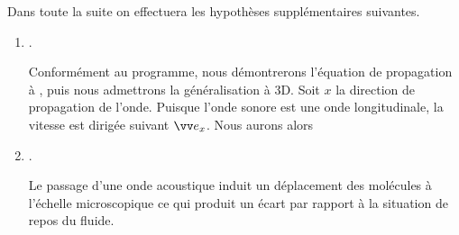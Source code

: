 \documentclass[12pt,fancy]{cours}
\begin{document}


 Dans toute la suite on effectuera les hypothèses supplémentaires suivantes. 
\begin{enumerate}[label=\boxed{\rm H\arabic*}]
\item {}.

Conformément au programme, nous démontrerons l'équation de propagation à , puis nous admettrons la généralisation à 3D. Soit $x$ la direction de propagation de l'onde. Puisque l'onde sonore est une onde longitudinale, la vitesse est dirigée suivant $\ex$. Nous aurons alors 
\item {}.

Le passage d'une onde acoustique induit un déplacement des molécules à l'échelle microscopique ce qui produit un écart par rapport à la situation de repos du fluide. 



%
%


\end{enumerate}
\end{document}
